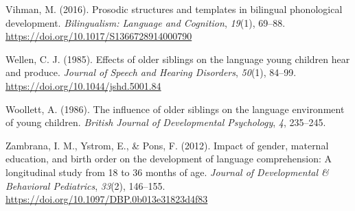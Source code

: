 \documentclass[
  english,
  man,floatsintext]{apa6}
\begin{document}
\leavevmode\hypertarget{ref-vihman_prosodic_2016}{}%
Vihman, M. (2016). Prosodic structures and templates in bilingual phonological development. \emph{Bilingualism: Language and Cognition}, \emph{19}(1), 69--88. \url{https://doi.org/10.1017/S1366728914000790}

\leavevmode\hypertarget{ref-wellen_effects_1985}{}%
Wellen, C. J. (1985). Effects of older siblings on the language young children hear and produce. \emph{Journal of Speech and Hearing Disorders}, \emph{50}(1), 84--99. \url{https://doi.org/10.1044/jshd.5001.84}

\leavevmode\hypertarget{ref-woollett_influence_1986}{}%
Woollett, A. (1986). The influence of older siblings on the language environment of young children. \emph{British Journal of Developmental Psychology}, \emph{4}, 235--245.

\leavevmode\hypertarget{ref-zambrana_impact_2012}{}%
Zambrana, I. M., Ystrom, E., \& Pons, F. (2012). Impact of gender, maternal education, and birth order on the development of language comprehension: A longitudinal study from 18 to 36 months of age. \emph{Journal of Developmental \& Behavioral Pediatrics}, \emph{33}(2), 146--155. \url{https://doi.org/10.1097/DBP.0b013e31823d4f83}

\endgroup
\end{document}

